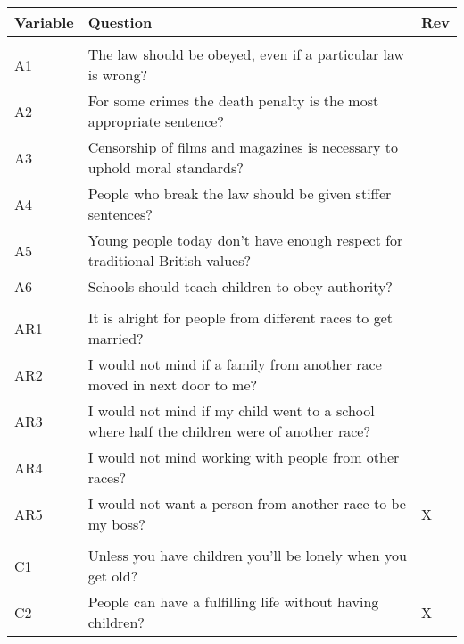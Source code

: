 \begin{tabular}{lll}
\toprule
Variable & Question & Rev\\
\midrule
\addlinespace[0.3em]
\multicolumn{3}{l}{\textbf{Authority (A)}}\\
\hline
\hspace{1em}A1 & The law should be obeyed, even if a particular law is wrong? & \\
\hspace{1em}A2 & For some crimes the death penalty is the most appropriate sentence? & \\
\hspace{1em}A3 & Censorship of films and magazines is necessary to uphold moral standards? & \\
\hspace{1em}A4 & People who break the law should be given stiffer sentences? & \\
\hspace{1em}A5 & Young people today don't have enough respect for traditional British values? & \\
\hspace{1em}A6 & Schools should teach children to obey authority? & \\
\addlinespace[0.3em]
\multicolumn{3}{l}{\textbf{Anti-Racism (AR)}}\\
\hline
\hspace{1em}AR1 & It is alright for people from different races to get married? & \\
\hspace{1em}AR2 & I would not mind if a family from another race moved in next door to me? & \\
\hspace{1em}AR3 & I would not mind if my child went to a school where half the children were of another race? & \\
\hspace{1em}AR4 & I would not mind working with people from other races? & \\
\hspace{1em}AR5 & I would not want a person from another race to be my boss? & X\\
\addlinespace[0.3em]
\multicolumn{3}{l}{\textbf{Children (C)}}\\
\hline
\hspace{1em}C1 & Unless you have children you'll be lonely when you get old? & \\
\hspace{1em}C2 & People can have a fulfilling life without having children? & X\\

\end{tabular}
